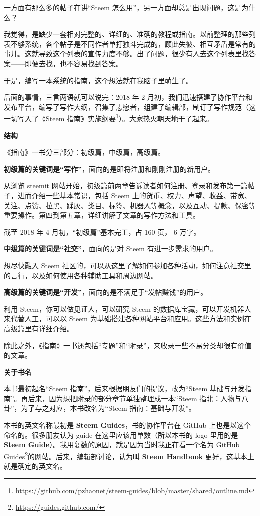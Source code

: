 \documentclass[]{ctexbook}
\renewcommand{\href}[2]{#2\footnote{\url{#1}}}
\begin{document}
一方面有那么多的帖子在讲``Steem 怎么用''，另一方面却总是出现问题，这是为什么？

我觉得，是缺少一套相对完整的、详细的、准确的教程或指南。以前整理的那些列表不够系统，各个帖子是不同作者单打独斗完成的，顾此失彼、相互矛盾是常有的事儿。这就导致这个列表的宣传力度不够。出了问题，很少有人去这个列表里找答案------即便去找，也不容易找到答案。

于是，编写一本系统的指南，这个想法就在我脑子里萌生了。

后面的事情，三言两语就可以说完：2018 年 2 月初，我们迅速搭建了协作平台和发布平台，编写了写作大纲，召集了志愿者，组建了编辑部，制订了写作规范（这一切写入了\href{https://github.com/pzhaonet/steem-guides/blob/master/shared/outline.md}{《Steem 指南》实施纲要}）。大家热火朝天地干了起来。

\textbf{结构}

《指南》一书分三部分：初级篇，中级篇，高级篇。

\textbf{初级篇的关键词是``写作''}，面向的是即将注册和刚刚注册的新用户。

从浏览 steemit 网站开始，初级篇前两章告诉读者如何注册、登录和发布第一篇帖子，进而介绍一些基本常识，包括 Steem 上的货币、权力、声望、收益、带宽、关注、点赞、拉黑、踩灰、类目、标签、机器人等概念，以及互动、提款、保密等重要操作。第四到第五章，详细讲解了文章的写作方法和工具。

截至 2018 年 4 月初，``初级篇''基本完工，占 160 页， 6 万字。

\textbf{中级篇的关键词是``社交''}，面向的是对 Steem 有进一步需求的用户。

想尽快融入 Steem 社区的，可以从这里了解如何参加各种活动，如何注意社交里的言行，以及如何使用各种辅助工具和周边网站。

\textbf{高级篇的关键词是``开发''}，面向的是不满足于``发帖赚钱''的用户。

利用 Steem，你可以做见证人，可以研究 Steem 的数据库宝藏，可以开发机器人来代替人工，可以以 Steem 为基础搭建各种网站平台和应用。这些方法和实例在高级篇里有详细介绍。

除此之外，《指南》一书还包括``专题''和``附录''，来收录一些不易分类却很有价值的文章。

\textbf{关于书名}

本书最初起名``Steem 指南''，后来根据朋友们的提议，改为``Steem 基础与开发指南''。再后来，因为想把附录的部分章节单独整理成一本``Steem 指北：人物与八卦''，为了与之对应，本书改名为``Steem 指南：基础与开发''。

本书的英文名称最初是 \textbf{Steem Guides}，书的协作平台在 GitHub 上也是以这个命名的。很多朋友认为 guide 在这里应该用单数（所以本书的 logo 里用的是 \textbf{Steem Guide}）。我用复数的原因，就是因为当时我正在看一个名为 \href{https://guides.github.com/}{GitHub Guides}的网站。后来，编辑部讨论，认为叫 \textbf{Steem Handbook} 更好，这基本上就是确定的英文名。
\end{document}
